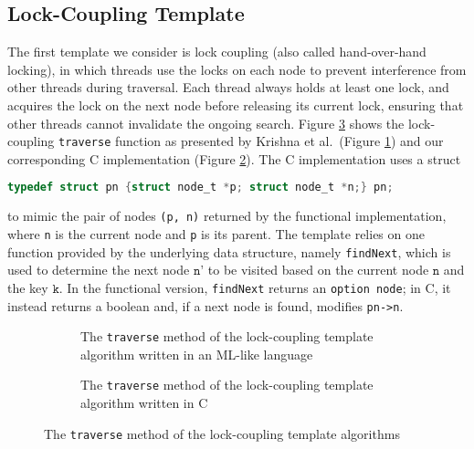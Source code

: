 \documentclass[a4paper,UKenglish,cleveref, autoref, thm-restate]{lipics-v2021}
\begin{document}
\subsection{Lock-Coupling Template}
\label{lock-coupling-algo}

The first template we consider is lock coupling (also called hand-over-hand locking), in which threads use the locks on each node to prevent interference from other threads during traversal. Each thread always holds at least one lock, and acquires the lock on the next node before releasing its current lock, ensuring that other threads cannot invalidate the ongoing search.
Figure \ref{traverse_lock} shows the lock-coupling \lstinline{traverse} function as presented by Krishna et al.~(Figure \ref{traverse_lock_a}) and our corresponding C implementation (Figure \ref{traverse_lock_b}). The C implementation uses a struct
\begin{lstlisting}[language = C, backgroundcolor=\color{white}, basicstyle=\ttfamily\footnotesize]
	typedef struct pn {struct node_t *p; struct node_t *n;} pn;
\end{lstlisting}
to mimic the pair of nodes \lstinline{(p, n)} returned by the functional implementation, where \lstinline{n} is the current node and \lstinline{p} is its parent. The template relies on one function provided by the underlying data structure, namely \lstinline{findNext}, which is used to determine the next node $\texttt{n'}$ to be visited based on the current node $\texttt{n}$ and the key $\texttt{k}$. In the functional version, \lstinline{findNext} returns an \lstinline{option node}; in C, it instead returns a boolean and, if a next node is found, modifies \lstinline{pn->n}.


\begin{figure}[h]
	\begin{subfigure}[t]{0.45\textwidth}
		 
		\caption{The \lstinline{traverse} method of the lock-coupling template algorithm written in an ML-like language \cite{krishna2019compositional}} 
		\label{traverse_lock_a}	
	\end{subfigure}\qquad
	\begin{subfigure}[t]{0.48\textwidth}
		 
		\caption{The \lstinline{traverse} method of the lock-coupling template algorithm written in C}
		\label{traverse_lock_b}
	\end{subfigure}
	\caption{The \lstinline{traverse} method of the lock-coupling template algorithms}
	\label{traverse_lock}
\end{figure}
\end{document}
